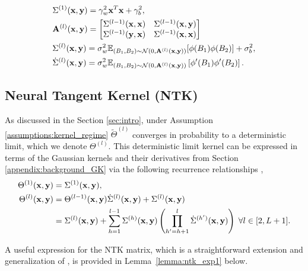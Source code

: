 \begin{equation}\label{equation:GP_kernel}
    \begin{aligned}
    &\Sigma^{(1)}(\mathbf x, \mathbf y) = \gamma_w^2 \mathbf x^T \mathbf x + \gamma_b^2,\\
    & \mathbf{A}^{(l)}(\mathbf x, \mathbf y) = \begin{bmatrix}
    \Sigma^{(l-1)}(\mathbf x, \mathbf x) & \Sigma^{(l-1)}(\mathbf x, \mathbf y)\\
    \Sigma^{(l-1)}(\mathbf y, \mathbf x) & \Sigma^{(l-1)}(\mathbf x, \mathbf x)
    \end{bmatrix}\\
    &\Sigma^{(l)}(\mathbf x, \mathbf y) = \sigma_w^2 \mathbb{E}_{(B_1, B_2) \sim \mathcal{N}(0, \mathbf{A}^{(l)}(\mathbf x, \mathbf y))}[\phi(B_1)\phi(B_2)] + \sigma_b^2,\\
    &\dot{\Sigma}^{(l)}(\mathbf x, \mathbf y) = \sigma_w^2\mathbb{E}_{(B_1, B_2) \sim \mathcal{N}(0, \mathbf{A}^{(l)}(\mathbf x, \mathbf y))}\left[\phi'(B_1) \phi'(B_2)\right].
    \end{aligned}
\end{equation}

\subsection{Neural Tangent Kernel (NTK)}\label{appendix:background_NTK}
As discussed in the Section \ref{sec:intro}, under Assumption \ref{assumptions:kernel_regime} $\tilde{\Theta}^{(l)}$ converges in probability to a deterministic limit, which we denote $\Theta^{(l)}$. This deterministic limit kernel can be expressed in terms of the Gaussian kernels and their derivatives from Section \ref{appendix:background_GK} via the following recurrence relationships \cite[Theorem 1]{jacot_ntk}, 
\begin{equation}\label{eq:ntk_kernel_def}
    \begin{aligned}
    \Theta^{(1)}(\mathbf x, \mathbf y) &= \Sigma^{(1)}(\mathbf x,\mathbf y),\\
    \Theta^{(l)}(\mathbf x, \mathbf y) &= \Theta^{(l-1)}(\mathbf x,\mathbf y) \dot{\Sigma}^{(l)}(\mathbf x,\mathbf y) + \Sigma^{(l)}(\mathbf x,\mathbf y)\\
    & = \Sigma^{(l)}(\mathbf x,\mathbf y) + \sum_{h=1}^{l-1}  \Sigma^{(h)}(\mathbf x, \mathbf y)\left( \prod_{h' = h+1}^{l} \dot{\Sigma}^{(h')}(\mathbf x, \mathbf y)\right) \; \forall l \in [2,L+1].
    \end{aligned}
\end{equation}

A useful expression for the NTK matrix, which is a straightforward extension and generalization of \citet[Lemma 3.1]{nguyen_tight_bounds}, is provided in Lemma~\ref{lemma:ntk_exp1} below. 

